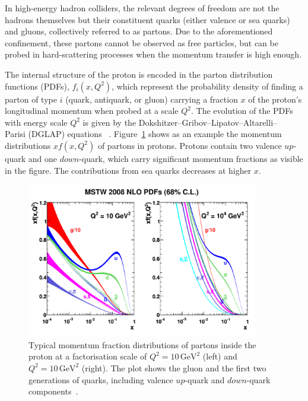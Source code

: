 In high-energy hadron colliders, the relevant degrees of freedom are not the hadrons themselves but their constituent quarks (either valence or sea quarks) and gluons, collectively referred to as partons. Due to the aforementioned confinement, these partons cannot be observed as free particles, but can be probed in hard-scattering processes when the momentum transfer is high enough.

The internal structure of the proton is encoded in the parton distribution functions (PDFs), \(f_i(x, Q^2)\), which represent the probability density of finding a parton of type \(i\) (quark, antiquark, or gluon) carrying a fraction \(x\) of the proton's longitudinal momentum when probed at a scale \(Q^2\). The evolution of the PDFs with energy scale $Q^2$ is given by the Dokshitzer–Gribov–Lipatov–Altarelli–\\Parisi (DGLAP) equations ~\cite{Gribov, ALTARELLI, Dokshitzer}. Figure~\ref{fig:pdfs} shows as an example the momentum distributions $xf(x,Q^2)$ of partons in protons. Protons contain two valence $up$-quark and one $down$-quark, which carry significant momentum fractions as visible in the figure. The contributions from sea quarks decreases at higher $x$.
\begin{figure}[htbp]
  \centering
  \includegraphics[width=0.9\textwidth]{images/pdfs.pdf}
  \caption{Typical momentum fraction distributions of partons inside the proton at a factorisation scale of \(Q^2 = 10\,\text{GeV}^2\) (left) and \(Q^2 = 10\,\text{GeV}^2\) (right). The plot shows the gluon and the first two generations of quarks, including valence $up$-quark and $down$-quark components~\cite{Martin_2009}.}
  \label{fig:pdfs}
\end{figure}


